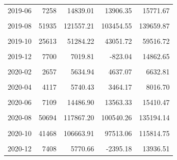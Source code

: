 \begin{longtable}[t]{crrrr}
2019-06 & 7258 & 14839.01 & 13906.35 & 15771.67\\
\cellcolor{gray!10}{2019-07} & \cellcolor{gray!10}{13394} & \cellcolor{gray!10}{21423.14} & \cellcolor{gray!10}{18998.26} & \cellcolor{gray!10}{23848.02}\\
2019-08 & 51935 & 121557.21 & 103454.55 & 139659.87\\
\cellcolor{gray!10}{2019-09} & \cellcolor{gray!10}{53234} & \cellcolor{gray!10}{131183.09} & \cellcolor{gray!10}{122098.73} & \cellcolor{gray!10}{140267.45}\\
2019-10 & 25613 & 51284.22 & 43051.72 & 59516.72\\
\cellcolor{gray!10}{2019-11} & \cellcolor{gray!10}{20585} & \cellcolor{gray!10}{40207.24} & \cellcolor{gray!10}{33868.30} & \cellcolor{gray!10}{46546.19}\\
2019-12 & 7700 & 7019.81 & -823.04 & 14862.65\\
\cellcolor{gray!10}{2020-01} & \cellcolor{gray!10}{2866} & \cellcolor{gray!10}{3967.91} & \cellcolor{gray!10}{2271.89} & \cellcolor{gray!10}{5663.93}\\
2020-02 & 2657 & 5634.94 & 4637.07 & 6632.81\\
\cellcolor{gray!10}{2020-03} & \cellcolor{gray!10}{3880} & \cellcolor{gray!10}{11145.49} & \cellcolor{gray!10}{9411.16} & \cellcolor{gray!10}{12879.82}\\
2020-04 & 4117 & 5740.43 & 3464.17 & 8016.70\\
\cellcolor{gray!10}{2020-05} & \cellcolor{gray!10}{4002} & \cellcolor{gray!10}{7483.41} & \cellcolor{gray!10}{6907.55} & \cellcolor{gray!10}{8059.27}\\
2020-06 & 7109 & 14486.90 & 13563.33 & 15410.47\\
\cellcolor{gray!10}{2020-07} & \cellcolor{gray!10}{15804} & \cellcolor{gray!10}{23058.11} & \cellcolor{gray!10}{20462.70} & \cellcolor{gray!10}{25653.51}\\
2020-08 & 50694 & 117867.20 & 100540.26 & 135194.14\\
\cellcolor{gray!10}{2020-09} & \cellcolor{gray!10}{69329} & \cellcolor{gray!10}{194118.75} & \cellcolor{gray!10}{180940.79} & \cellcolor{gray!10}{207296.72}\\
2020-10 & 41468 & 106663.91 & 97513.06 & 115814.75\\
\cellcolor{gray!10}{2020-11} & \cellcolor{gray!10}{13463} & \cellcolor{gray!10}{12881.90} & \cellcolor{gray!10}{4393.72} & \cellcolor{gray!10}{21370.07}\\
2020-12 & 7408 & 5770.66 & -2395.18 & 13936.51\\

\end{longtable}
